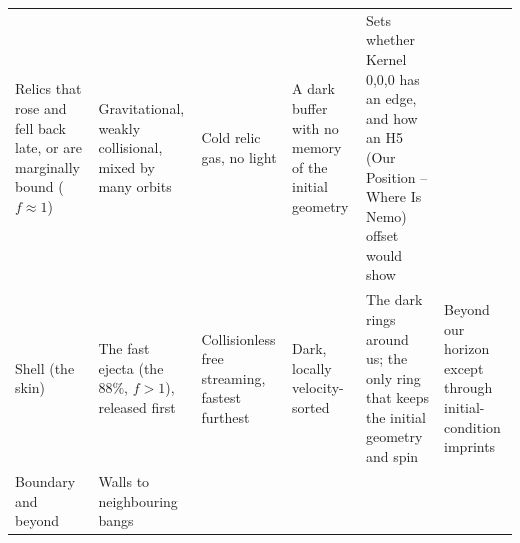 \documentclass[
  11pt,
]{article}
\begin{document}
\begin{longtable}[]{@{}llllll@{}}
\begin{minipage}[t]{0.14\columnwidth}
Relics that rose and fell back late, or are marginally bound
(\(f \approx 1\))\strut
\end{minipage} & \begin{minipage}[t]{0.14\columnwidth}\raggedright
Gravitational, weakly collisional, mixed by many orbits\strut
\end{minipage} & \begin{minipage}[t]{0.14\columnwidth}\raggedright
Cold relic gas, no light\strut
\end{minipage} & \begin{minipage}[t]{0.14\columnwidth}\raggedright
A dark buffer with no memory of the initial geometry\strut
\end{minipage} & \begin{minipage}[t]{0.14\columnwidth}\raggedright
Sets whether Kernel 0,0,0 has an edge, and how an H5 (Our Position --
Where Is Nemo) offset would show\strut
\end{minipage}\tabularnewline
\begin{minipage}[t]{0.14\columnwidth}\raggedright
Shell (the skin)\strut
\end{minipage} & \begin{minipage}[t]{0.14\columnwidth}\raggedright
The fast ejecta (the \(88\%\), \(f > 1\)), released first\strut
\end{minipage} & \begin{minipage}[t]{0.14\columnwidth}\raggedright
Collisionless free streaming, fastest furthest\strut
\end{minipage} & \begin{minipage}[t]{0.14\columnwidth}\raggedright
Dark, locally velocity-sorted\strut
\end{minipage} & \begin{minipage}[t]{0.14\columnwidth}\raggedright
The dark rings around us; the only ring that keeps the initial geometry
and spin\strut
\end{minipage} & \begin{minipage}[t]{0.14\columnwidth}\raggedright
Beyond our horizon except through initial-condition imprints\strut
\end{minipage}\tabularnewline
\begin{minipage}[t]{0.14\columnwidth}\raggedright
Boundary and beyond\strut
\end{minipage} & \begin{minipage}[t]{0.14\columnwidth}\raggedright
Walls to neighbouring bangs\strut
\end{minipage} & \begin{minipage}[t]{0.14\columnwidth}\raggedright

\end{minipage}
\end{longtable}
\end{document}

